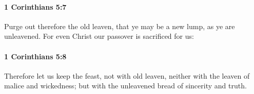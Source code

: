 		\paragraph{1 Corinthians 5:7} %
			\label{1CORINTHIANS-5-7}

			Purge out therefore the old leaven, that ye may be a new lump, as ye are unleavened. For even Christ our passover is sacrificed for us:

			\begin{framed}
			\scriptsize
				\begin{compactdesc}
					\item[SBLG] 
				\end{compactdesc}
			\end{framed}

		\paragraph{1 Corinthians 5:8} %
			\label{1CORINTHIANS-5-8}

			Therefore let us keep the feast, not with old leaven, neither with the leaven of malice and wickedness; but with the unleavened bread of sincerity and truth.

